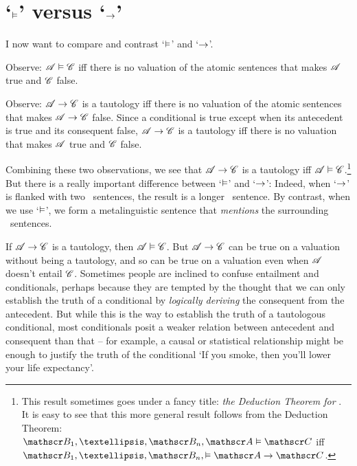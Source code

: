 \section{`$\vDash$' versus `$\rightarrow$'}
I now want to compare and contrast `$\vDash$' and `$\rightarrow$'. 

Observe: $\mathscr{A} \vDash \mathscr{C}$ iff there is no valuation of the atomic sentences that makes $\mathscr{A}$ true and $\mathscr{C}$ false. 

Observe: $\mathscr{A} \rightarrow \mathscr{C}$ is a tautology iff there is no valuation of the atomic sentences that makes $\mathscr{A} \rightarrow \mathscr{C}$ false. Since a conditional is true except when its antecedent is true and its consequent false, $\mathscr{A} \rightarrow \mathscr{C}$ is a tautology iff there is no valuation that makes $\mathscr{A}$ true and $\mathscr{C}$ false. 

Combining these two observations, we see that $\mathscr{A} \rightarrow \mathscr{C}$  is a tautology iff  $\mathscr{A} \vDash \mathscr{C}$\label{ded.thm}.\footnote{This result sometimes goes under a fancy title: \emph{the Deduction Theorem for \TFL}. It is easy to see that this more general result follows from the Deduction Theorem: $\meta{B}_{1},…,\meta{B}_{n},\meta{A}\entails \meta{C}$ iff $\meta{B}_{1},…,\meta{B}_{n},\entails \meta{A}\eif\meta{C}$.} But there is a really important difference between `$\vDash$' and `$\rightarrow$':
Indeed, when `$\rightarrow$' is flanked with two \TFL\ sentences, the result is a longer \TFL\ sentence. By contrast, when we use `$\vDash$', we form a metalinguistic sentence that \emph{mentions} the surrounding \TFL\ sentences. 

If $\mathscr{A}\rightarrow\mathscr{C}$ is a tautology, then $\mathscr{A}\vDash\mathscr{C}$. But $\mathscr{A}\rightarrow\mathscr{C}$ can be true on a valuation without being a tautology, and so can be true on a valuation even when $\mathscr{A}$ doesn't entail $\mathscr{C}$. Sometimes people are inclined to confuse entailment and conditionals, perhaps because they are tempted by the thought that we can only establish the truth of a conditional by \emph{logically deriving} the consequent from the antecedent. But while this is the way to establish the truth of a tautologous conditional, most conditionals posit a weaker relation between antecedent and consequent than that – for example, a causal or statistical relationship might be enough to justify the truth of the conditional `If you smoke, then you'll lower your life expectancy'.

